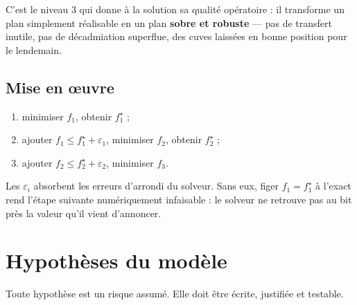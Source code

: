 \begin{encadre}
C'est le niveau 3 qui donne à la solution sa qualité opératoire : il transforme un plan
simplement réalisable en un plan \textbf{sobre et robuste} --- pas de transfert inutile, pas
de décadmiation superflue, des cuves laissées en bonne position pour le lendemain.
\end{encadre}

\subsection{Mise en œuvre}

\begin{enumerate}
  \item minimiser $f_1$, obtenir $f_1^\star$ ;
  \item ajouter $f_1 \le f_1^\star + \varepsilon_1$, minimiser $f_2$, obtenir $f_2^\star$ ;
  \item ajouter $f_2 \le f_2^\star + \varepsilon_2$, minimiser $f_3$.
\end{enumerate}

Les $\varepsilon_i$ absorbent les erreurs d'arrondi du solveur. Sans eux, figer
$f_1 = f_1^\star$ à l'exact rend l'étape suivante numériquement infaisable : le solveur ne
retrouve pas au bit près la valeur qu'il vient d'annoncer.

\section{Hypothèses du modèle}

Toute hypothèse est un risque assumé. Elle doit être écrite, justifiée et testable.

